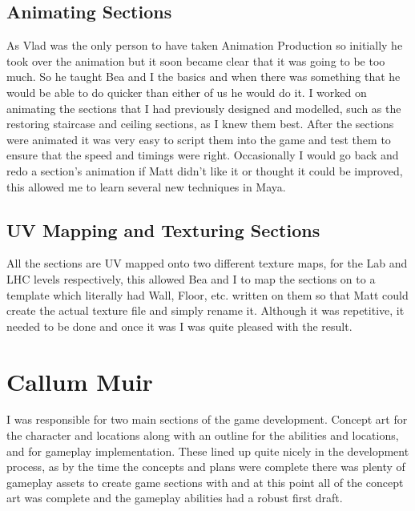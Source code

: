 \documentclass[a4paper,oneside]{memoir}
\begin{document}
				
			\subsection{Animating Sections}

				As Vlad was the only person to have taken Animation Production so initially he took over the animation but it soon became clear that it was going to be too much. So he taught Bea and I the basics and when there was something that he would be able to do quicker than either of us he would do it.
				I worked on animating the sections that I had previously designed and modelled, such as the restoring staircase and ceiling sections, as I knew them best. After the sections were animated it was very easy to script them into the game and test them to ensure that the speed and timings were right. Occasionally I would go back and redo a section's animation if Matt didn't like it or thought it could be improved, this allowed me to learn several new techniques in Maya.

			\subsection{UV Mapping and Texturing Sections}

				All the sections are UV mapped onto two different texture maps, for the Lab and LHC levels respectively, this allowed Bea and I to map the sections on to a template which literally had Wall, Floor, etc. written on them so that Matt could create the actual texture file and simply rename it. Although it was repetitive, it needed to be done and once it was I was quite pleased with the result.

		\section{Callum Muir}
				I was responsible for two main sections of the game development. 
				Concept art for the character and locations along with an outline for the abilities and locations, and for gameplay implementation. 
				These lined up quite nicely in the development process, as by the time the concepts and plans were complete there was plenty of gameplay assets to create game sections with and at this point all of the concept art was complete and the gameplay abilities had a robust first draft. 
\end{document}
